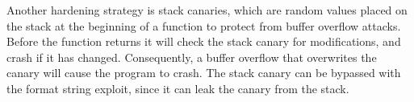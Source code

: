 Another hardening strategy is stack canaries, which are random values placed on the stack at the beginning of a function to protect from buffer overflow attacks\cite{canary}. Before the function returns it will check the stack canary for modifications, and crash if it has changed. Consequently, a buffer overflow that overwrites the canary will cause the program to crash. The stack canary can be bypassed with the format string exploit, since it can leak the canary from the stack.




